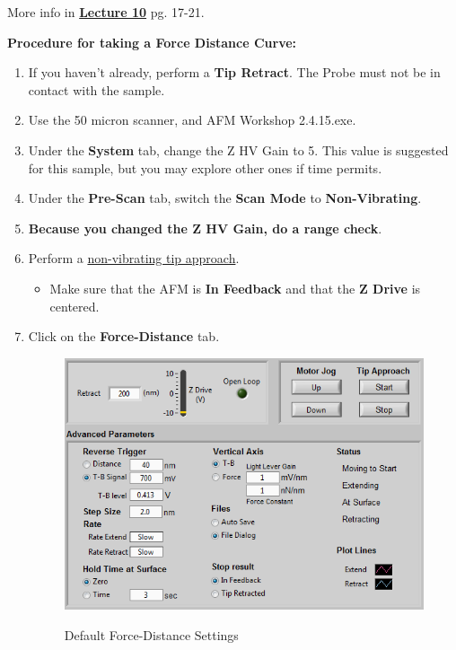 \documentclass{../lab}
\begin{document}
More info in\textbf{ }\href{http://experimentationlab.berkeley.edu/sites/default/files/AFMImages/Lecture\_10\_AFM.pdf}{\textbf{Lecture 10}} pg. 17-21.

\textbf{Procedure for taking a Force Distance Curve:}

\begin{enumerate}
    \item If you haven't already, perform a \textbf{Tip Retract}. The Probe must not be in contact with the sample.

    \item Use the 50 micron scanner, and AFM Workshop 2.4.15.exe.

    \item Under the \textbf{System} tab, change the Z HV Gain to 5. This value is suggested for this sample, but you may explore other ones if time permits.

    \item Under the \textbf{Pre-Scan} tab, switch the \textbf{Scan Mode} to \textbf{Non-Vibrating}.

    \item \textbf{Because you changed the Z HV Gain, do a range check}.

    \item Perform a \hyperref[subsec:TipApproach]{non-vibrating tip approach}.
    \begin{itemize}
        \item Make sure that the AFM is \textbf{In Feedback} and that the \textbf{Z Drive} is centered.
    \end{itemize}

    \item Click on the \textbf{Force-Distance} tab.
        
        \begin{figure}[h]
        \centering
            \href{http://experimentationlab.berkeley.edu/sites/default/files/FD.png}{\includegraphics[width=0.9\linewidth]{images/FD.png}}
            \caption{Default Force-Distance Settings}
        \end{figure}
    

\end{enumerate}
\end{document}
